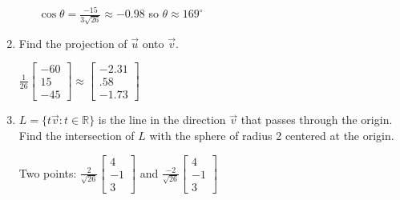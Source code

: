 \documentclass[11pt]{exam}
\newcommand{\R}{\mathbb{R}}
\newcommand{\mat}[1]{\begin{bmatrix}#1\end{bmatrix}}
\begin{document}
\begin{enumerate}
\begin{enumerate}
		$\cos \theta = \frac{-15}{3\sqrt{26}}\approx-0.98$ so $\theta \approx 169^\circ$
	\end{enumerate}
	\item  Find the projection of $\vec u$ onto $\vec v$.

	$\frac{1}{26}\mat{-60\\15\\-45}\approx\mat{-2.31\\.58\\-1.73}$
	\item $L=\{t\vec v: t\in \R\}$ is the line in the direction $\vec v$ that
	passes through the origin.  Find the intersection of $L$ with the sphere
	of radius 2 centered at the origin.

	Two points: $\frac{2}{\sqrt{26}}\mat{4\\-1\\3}$ and $\frac{-2}{\sqrt{26}}\mat{4\\-1\\3}$
\end{enumerate}
	
\end{document}
